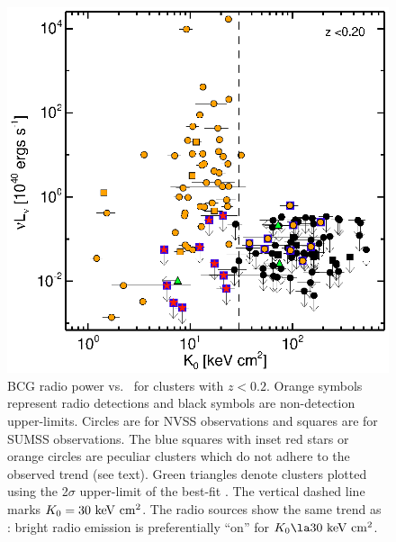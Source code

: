 \documentclass[12pt,preprint]{aastex}
\begin{document}
\clearpage
\begin{figure}
  \begin{center}
    \includegraphics*[width=\columnwidth, trim=28mm 7mm 40mm 17mm, clip]{f2.eps}
    \caption{BCG radio power vs. \kna\ for clusters with $z <
      0.2$. Orange symbols represent radio detections and black
      symbols are non-detection upper-limits. Circles are for NVSS
      observations and squares are for SUMSS observations. The blue
      squares with inset red stars or orange circles are peculiar
      clusters which do not adhere to the observed trend (see text).
      Green triangles denote clusters plotted using the 2$\sigma$
      upper-limit of the best-fit \kna. The vertical dashed line marks
      $K_0 = 30 \mathrm{\mbox{\ensuremath{\mathrm{~keV}}} \mathrm{\mbox{\ensuremath{\mathrm{~cm}}}^2}}$. The radio sources show the same trend as
      \halpha: bright radio emission is preferentially ``on'' for
      $\kna \la 30 \ent$.}
    \label{fig:radzcut}
  \end{center}
\end{figure}
\end{document}
